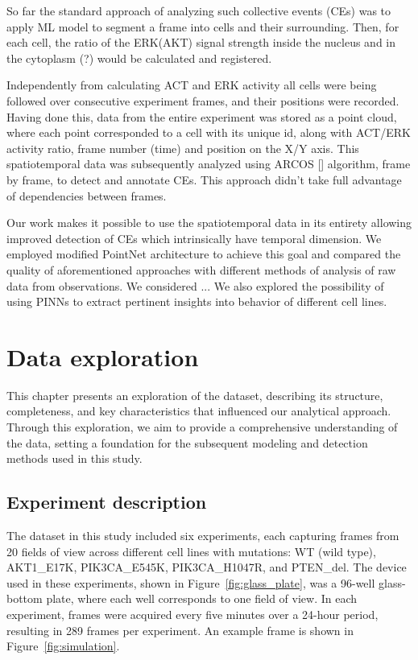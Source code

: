 \documentclass[licencjacka,en]{pracamgr}
\begin{document}

So far the standard approach of analyzing such collective events (CEs) was to apply ML model to segment a frame into cells and their surrounding. 
Then, for each cell, the ratio of the ERK(AKT) signal strength inside the nucleus and in the cytoplasm (?) would be calculated and registered.

Independently from calculating ACT and ERK activity all cells were being followed over consecutive experiment frames, and their positions were recorded. Having done this, data from the entire experiment was stored as a point cloud, where each point corresponded to a cell with its unique id, along with ACT/ERK activity ratio, frame number (time) and position on the X/Y axis.
This spatiotemporal data was subsequently analyzed using ARCOS [\cite{}] algorithm, frame by frame, to detect and annotate CEs. This approach didn't take full advantage of dependencies between frames.

Our work makes it possible to use the spatiotemporal data in its entirety 
allowing improved detection of CEs which intrinsically have temporal dimension. 
We employed modified PointNet architecture to achieve this goal and compared the quality of aforementioned approaches with different methods of analysis of raw data from observations.
We considered ...
We also explored the possibility of using PINNs 
to extract pertinent insights into behavior of different cell lines.


\chapter{Data exploration}\label{r:exploration}

This chapter presents an exploration of the dataset, describing its structure, completeness, and key characteristics that influenced our analytical approach. Through this exploration, we aim to provide a comprehensive understanding of the data, setting a foundation for the subsequent modeling and detection methods used in this study.

\section{Experiment description}
The dataset in this study included six experiments, each capturing frames from 20 fields of view across different cell lines with mutations: WT (wild type), AKT1\_E17K, PIK3CA\_E545K, PIK3CA\_H1047R, and PTEN\_del. The device used in these experiments, shown in Figure~\ref{fig:glass_plate}, was a 96-well glass-bottom plate, where each well corresponds to one field of view. In each experiment, frames were acquired every five minutes over a 24-hour period, resulting in 289 frames per experiment. An example frame is shown in Figure~\ref{fig:simulation}.
\end{document}
